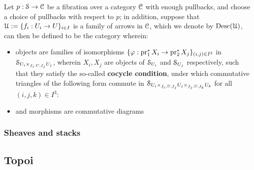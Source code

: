             \begin{definition} \label{def: descent_data}
                Let $p: \S \to \C$ be a fibration over a category $\C$ with enough pullbacks, and choose a choice of pullbacks with respect to $p$; in addition, suppose that $\calU := \{f_i: U_i \to U\}_{i \in I}$ is a family of arrows in $\C$, which we denote by $\Desc(\calU)$, can then be defined to be the category wherein:
                    \begin{itemize}
                        \item objects are families of isomorphisms $\{\varphi: \pr_1^*X_i \to \pr_2^*X_j\}_{(i, j) \in I^2}$ in $\S_{U_i \x_{f_i, U, f_j} U_j}$, wherein $X_i, X_j$ are objects of $\S_{U_i}$ and $\S_{U_j}$ respectively, such that they satisfy the so-called \textbf{cocycle condition}, under which commutative triangles of the following form commute in $\S_{U_i \x_{f_i, U, f_j} U_j \x_{f_j, U, f_k} U_k}$ for all $(i, j, k) \in I^3$:
                        \item and morphisms are commutative diagrams 
                    \end{itemize}
            \end{definition}
            
        \subsubsection{Sheaves and stacks}
    
    \subsection{Topoi}